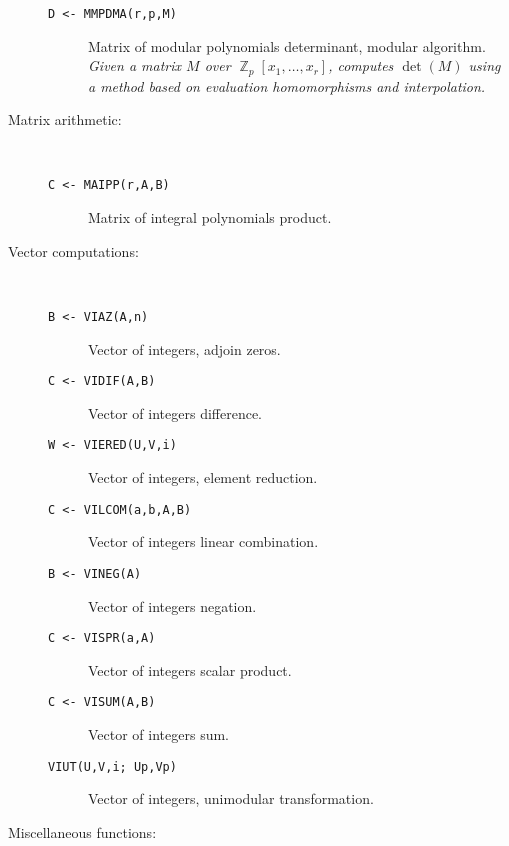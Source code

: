 \begin{description}
\begin{description}
\item[{\tt D <- MMPDMA(r,p,M) 
}] Matrix of modular polynomials determinant, modular
algorithm. {\em Given a matrix $M$ over $\BbbZ _p[x_1,\ldots,x_r]$,
computes $\det(M)$ using a method based on evaluation homomorphisms
and interpolation.}

\end{description} %


\item[Matrix arithmetic:] \ \

\begin{description}

\item[{\tt C <- MAIPP(r,A,B) 
}] Matrix of integral polynomials product.

\end{description} %


\item[Vector computations:] \ \

\begin{description}

\item[{\tt B <- VIAZ(A,n) 
}] Vector of integers, adjoin zeros. 

\item[{\tt C <- VIDIF(A,B) 
}] Vector of integers difference. 

\item[{\tt W <- VIERED(U,V,i) 
}] Vector of integers, element reduction.

\item[{\tt C <- VILCOM(a,b,A,B) 
}] Vector of integers linear combination.

\item[{\tt B <- VINEG(A) 
}] Vector of integers negation.

\item[{\tt C <- VISPR(a,A) 
}] Vector of integers scalar product.

\item[{\tt C <- VISUM(A,B) 
}] Vector of integers sum.

\item[{\tt  VIUT(U,V,i; Up,Vp) 
}] Vector of integers, unimodular transformation.

\end{description} %


\item[Miscellaneous functions:] \ \


\end{description}
